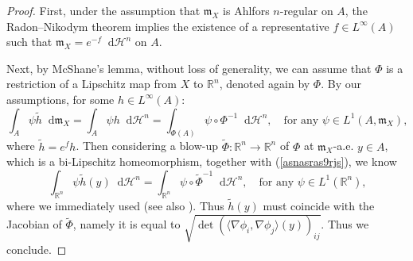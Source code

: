\documentclass[11pt,reqno]{amsart}
\theoremstyle{definition}
\numberwithin{equation}{section}
\newcommand{\fm}{\mathfrak{m}}
\newcommand{\di}{\mathop{}\!\mathrm{d}}
\newcommand{\meas}{\mathfrak{m}}
\newcommand{\haus}{\mathscr{H}}
\begin{document}
\begin{proof}
First, under the assumption that $\fm_X$ is Ahlfors $n$-regular on $A$, the Radon–Nikodym theorem implies the existence of a representative  $f\in L^{\infty}(A)$ such that $\fm_X = e^{-f}\di \mathscr{H}^n$ on $A$.

Next, by McShane's lemma, without loss of generality, we can assume that $\Phi$ is a restriction of a Lipschitz map from $X$ to $\mathbb{R}^n$, denoted again by $\Phi$.
By our assumptions,
for some $h \in L^{\infty}(A)$:
\begin{equation}\label{coarea145}
\int_A\psi \tilde h\di \meas_X=\int_{A}\psi h\di \haus^n=\int_{\Phi(A)}\psi\circ \Phi^{-1}\di \haus^n,\quad \text{for any $\psi \in L^1(A, \meas_X)$,}
\end{equation}
where $\tilde h=e^fh$. Then considering a blow-up $\tilde \Phi:\mathbb{R}^n \to \mathbb{R}^n$ of $\Phi$ at $\meas_X$-a.e. $y \in A$, which is a bi-Lipschitz homeomorphism, together with (\ref{asnasras9rjs}), we know
\begin{equation}
    \int_{\mathbb{R}^n}\psi \tilde h(y)\di \haus^n=\int_{\mathbb{R}^n}\psi \circ \tilde \Phi^{-1}\di \haus^n,\quad \text{for any $\psi \in L^1(\mathbb{R}^n)$,}
\end{equation}
where we immediately used \cite[Theorem 5.4]{AHPT} (see also \cite{Chee}).
Thus $\tilde h(y)$ must coincide with the Jacobian of $\tilde \Phi$, namely it is equal to $\sqrt{\det(\langle \nabla \phi_i, \nabla \phi_j\rangle (y))_{ij}}$. Thus we conclude.
\end{proof}
\end{document}
